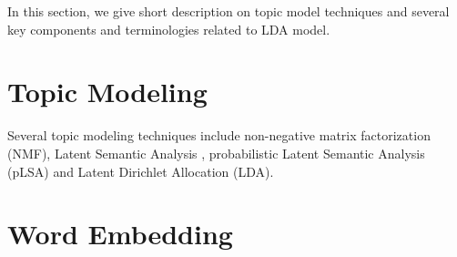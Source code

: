 In this section, we give short description on topic model techniques and several key components and terminologies related to LDA model.
\section{Topic Modeling} Several topic modeling techniques include non-negative matrix factorization (NMF), Latent Semantic Analysis \cite{landauer_solution_1997}, probabilistic Latent Semantic Analysis (pLSA) \cite{hofmann_probabilistic_2013} and Latent Dirichlet Allocation (LDA)\cite{blei_latent_2003}.

\section{Word Embedding}

